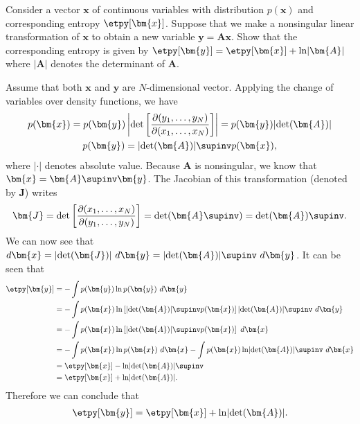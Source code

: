 \begin{question}{1.32}
	Consider a vector $\bm{x}$ of continuous variables with distribution $p(\bm{x})$ and corresponding entropy $\etpy[\bm{x}]$. Suppose that we make a nonsingular linear transformation of $\bm{x}$ to obtain a new variable $\bm{y} = \bm{Ax}$. Show that the corresponding entropy is given by $\etpy[\bm{y}] = \etpy[\bm{x}] + \ln \lvert \bm{A} \rvert$ where $\lvert \bm{A} \rvert$ denotes the determinant of $\bm{A}$.
\end{question}

\begin{answer}{}
	Assume that both $\bm{x}$ and $\bm{y}$ are $N$-dimensional vector. Applying the change of variables over density functions, we have
	\begin{gather}
		p(\bm{x}) = p(\bm{y}) \left \lvert \det \left[\frac{\partial (y_1, \ldots, y_N)}{\partial (x_1, \ldots, x_N)}\right]\right\rvert = p(\bm{y}) \lvert \det(\bm{A})\rvert\\
		p(\bm{y}) =  \lvert\det(\bm{A})\rvert\supinv p(\bm{x}),
	\end{gather}
	where $\lvert \cdot \rvert$ denotes absolute value. Because $\bm{A}$ is nonsingular, we know that $\bm{x} = \bm{A}\supinv\bm{y}$. The Jacobian of this transformation (denoted by $\bm{J}$) writes
	\begin{align}
		\bm{J} = \det\left[\frac{\partial (x_1, \ldots, x_N)}{\partial (y_1, \ldots, y_N)}\right] = \det (\bm{A}\supinv) = \det(\bm{A})\supinv.
	\end{align}
	We can now see that $d\bm{x} = \lvert \det(\bm{J}) \rvert \ d\bm{y} = \lvert\det(\bm{A})\rvert\supinv \ d\bm{y}$. It can be seen that
	\begin{align}
		\etpy[\bm{y}] &= -\int p(\bm{y}) \ln p(\bm{y})\ d\bm{y}\\
		&= -\int p(\bm{x}) \ln \left[ \lvert\det(\bm{A})\rvert\supinv p(\bm{x}) \right]  \lvert\det(\bm{A})\rvert\supinv\ d\bm{y}\\
		&= -\int p(\bm{x}) \ln \left[ \lvert\det(\bm{A})\rvert\supinv p(\bm{x}) \right]\ d\bm{x}\\
		&= -\int p(\bm{x}) \ln p(\bm{x})\ d\bm{x} -\int p(\bm{x}) \ln \lvert\det(\bm{A})\rvert\supinv\ d\bm{x}\\
		&= \etpy[\bm{x}] - \ln \lvert\det(\bm{A})\rvert\supinv\\
		&= \etpy[\bm{x}] + \ln \lvert\det(\bm{A})\rvert.
	\end{align}
	Therefore we can conclude that 
	\begin{align}
		\etpy[\bm{y}] = \etpy[\bm{x}] + \ln \lvert\det(\bm{A})\rvert.
	\end{align}
\end{answer}